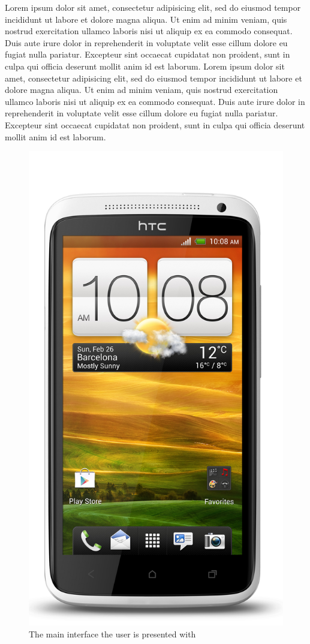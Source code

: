 \documentclass{chi-ext}
\begin{document}
Lorem ipsum dolor sit amet, consectetur adipisicing elit, sed do eiusmod tempor incididunt ut labore et dolore magna aliqua. Ut enim ad minim veniam, quis nostrud exercitation ullamco laboris nisi ut aliquip ex ea commodo consequat. Duis aute irure dolor in reprehenderit in voluptate velit esse cillum dolore eu fugiat nulla pariatur. Excepteur sint occaecat cupidatat non proident, sunt in culpa qui officia deserunt mollit anim id est laborum. Lorem ipsum dolor sit amet, consectetur adipisicing elit, sed do eiusmod tempor incididunt ut labore et dolore magna aliqua. Ut enim ad minim veniam, quis nostrud exercitation ullamco laboris nisi ut aliquip ex ea commodo consequat. Duis aute irure dolor in reprehenderit in voluptate velit esse cillum dolore eu fugiat nulla pariatur. Excepteur sint occaecat cupidatat non proident, sunt in culpa qui officia deserunt mollit anim id est laborum.

\pagebreak

\begin{figure}
\parbox{\columnwidth}{
  \centering
  \includegraphics[width=0.8\columnwidth]{onex.jpg}
  \caption{The main interface the user is presented with}
  \label{fig:maininterface}
}
\end{figure}
\end{document}
